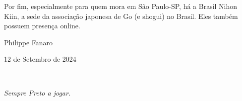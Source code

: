 Por fim, especialmente para quem mora em São Paulo-SP, há a Brasil Nihon Kiin, a sede da associação japonesa de Go (e shogui) no Brasil. Eles também possuem presença online.

\bigskip
\bigskip

Philippe Fanaro

12 de Setembro de 2024


\newpage 

\ %

\newpage

\vspace*{\fill}

\begin{center}
  \Large \emph{Sempre Preto a jogar.}
\end{center}

\vspace*{\fill}

